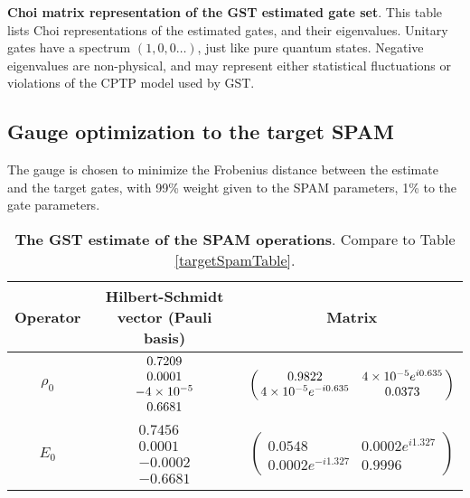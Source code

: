 {\begin{table}[h]
\begin{center}
\caption{\textbf{Choi matrix representation of the GST estimated gate set}.  This table lists Choi representations of the estimated gates, and their eigenvalues.  Unitary gates have a spectrum $(1,0,0\ldots)$, just like pure quantum states.  Negative eigenvalues are non-physical, and may represent either statistical fluctuations or violations of the CPTP model used by GST.\label{bestTargetGatesetChoiTable}}
\end{center}
\end{table}


\clearpage

\subsection{Gauge optimization to the target SPAM}
The gauge is chosen to minimize the Frobenius distance between the estimate and the target gates, with 99\% weight given to the SPAM parameters, 1\% to the gate parameters.

\begin{table}[h]
\begin{center}
\begin{tabular}[l]{|c|c|c|}
\hline
Operator & Hilbert-Schmidt vector (Pauli basis) & Matrix \\ \hline
$\rho_{0}$ & $ \begin{array}{c}
0.7209 \\ 
0.0001 \\ 
-4\times 10^{-5} \\ 
0.6681
 \end{array} $
 & $ \left(\!\!\begin{array}{cc}
0.9822 & 4\times 10^{-5}e^{i0.635} \\ 
4\times 10^{-5}e^{-i0.635} & 0.0373
 \end{array}\!\!\right) $
 \\ \hline
$E_{0}$ & $ \begin{array}{c}
0.7456 \\ 
0.0001 \\ 
-0.0002 \\ 
-0.6681
 \end{array} $
 & $ \left(\!\!\begin{array}{cc}
0.0548 & 0.0002e^{i1.327} \\ 
0.0002e^{-i1.327} & 0.9996
 \end{array}\!\!\right) $
 \\ \hline
\end{tabular}

\caption{\textbf{The GST estimate of the SPAM operations}.  Compare to Table \ref{targetSpamTable}.\label{bestTargetSpamGatesetSpamTable}}
\end{center}
\end{table}

}

